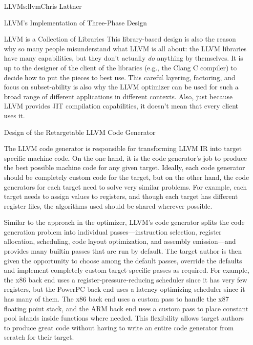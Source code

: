 \begin{aosachapter}{LLVM}{s:llvm}{Chris Lattner}
\begin{aosasect1}{LLVM's Implementation of Three-Phase Design}
\begin{aosasect2}{LLVM is a Collection of Libraries}
This library-based design is also the reason why so many people
misunderstand what LLVM is all about: the LLVM libraries have many
capabilities, but they don't actually \emph{do} anything by themselves.
It is up to the designer of the client of the libraries (e.g., the
Clang C compiler) to decide how to put the pieces to best use.  This
careful layering, factoring, and focus on subset-ability is also why
the LLVM optimizer can be used for such a broad range of different
applications in different contexts.  Also, just because LLVM provides
JIT compilation capabilities, it doesn't mean that every client uses
it.

\end{aosasect2}

\end{aosasect1}

\begin{aosasect1}{Design of the Retargetable LLVM Code Generator}

The LLVM code generator is responsible for transforming LLVM IR into
target specific machine code.  On the one hand, it is the code
generator's job to produce the best possible machine code for any
given target.  Ideally, each code generator should be completely
custom code for the target, but on the other hand, the code generators
for each target need to solve very similar problems.  For example,
each target needs to assign values to registers, and though each
target has different register files, the algorithms used should be
shared wherever possible.

Similar to the approach in the optimizer, LLVM's code generator splits
the code generation problem into individual passes---instruction
selection, register allocation, scheduling, code layout optimization,
and assembly emission---and provides many builtin passes that are run
by default.  The target author is then given the opportunity to choose
among the default passes, override the defaults and implement
completely custom target-specific passes as required.  For example,
the x86 back end uses a register-pressure-reducing scheduler since it
has very few registers, but the PowerPC back end uses a latency
optimizing scheduler since it has many of them.  The x86 back end uses
a custom pass to handle the x87 floating point stack, and the ARM
back end uses a custom pass to place constant pool islands inside
functions where needed.  This flexibility allows target authors to
produce great code without having to write an entire code generator
from scratch for their target.


\end{aosasect1}
\end{aosachapter}
